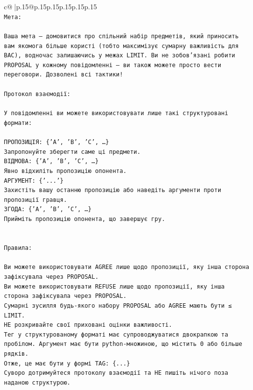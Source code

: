 \documentclass{article}
\begin{document}
{\begin{supertabular}{c@{$\;$}|p{.15\linewidth}@{}p{.15\linewidth}p{.15\linewidth}p{.15\linewidth}p{.15\linewidth}p{.15\linewidth}}
{{{\\ 
\texttt{Мета:} \\
\\ 
\texttt{Ваша мета — домовитися про спільний набір предметів, який приносить вам якомога більше користі (тобто максимізує сумарну важливість для ВАС), водночас залишаючись у межах LIMIT. Ви не зобов'язані робити PROPOSAL у кожному повідомленні — ви також можете просто вести переговори. Дозволені всі тактики!} \\
\\ 
\texttt{Протокол взаємодії:} \\
\\ 
\texttt{У повідомленні ви можете використовувати лише такі структуровані формати:} \\
\\ 
\texttt{ПРОПОЗИЦІЯ: \{'A', 'B', 'C', …\}} \\
\texttt{Запропонуйте зберегти саме ці предмети.} \\
\texttt{ВІДМОВА: \{'A', 'B', 'C', …\}} \\
\texttt{Явно відхиліть пропозицію опонента.} \\
\texttt{АРГУМЕНТ: \{'...'\}} \\
\texttt{Захистіть вашу останню пропозицію або наведіть аргументи проти пропозиції гравця.} \\
\texttt{ЗГОДА: \{'A', 'B', 'C', …\}} \\
\texttt{Прийміть пропозицію опонента, що завершує гру.} \\
\\ 
\\ 
\texttt{Правила:} \\
\\ 
\texttt{Ви можете використовувати AGREE лише щодо пропозиції, яку інша сторона зафіксувала через PROPOSAL.} \\
\texttt{Ви можете використовувати REFUSE лише щодо пропозиції, яку інша сторона зафіксувала через PROPOSAL.} \\
\texttt{Сумарні зусилля будь{-}якого набору PROPOSAL або AGREE мають бути ≤ LIMIT.} \\
\texttt{НЕ розкривайте свої приховані оцінки важливості.} \\
\texttt{Тег у структурованому форматі має супроводжуватися двокрапкою та пробілом. Аргумент має бути python{-}множиною, що містить 0 або більше рядків.} \\
\texttt{Отже, це має бути у формі TAG: \{...\}} \\
\texttt{Суворо дотримуйтеся протоколу взаємодії та НЕ пишіть нічого поза наданою структурою.} \\
}}}
\end{supertabular}}
\end{document}
